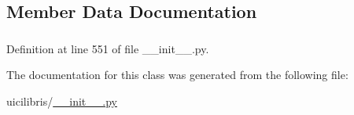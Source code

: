 \subsection{\-Member \-Data \-Documentation}
\hypertarget{classuicilibris_1_1latexViewThread_a2280202512f395afb09e42f820d27fad}{
\subsubsection[{pdf\-File\-Name}]{}}\label{classuicilibris_1_1latexViewThread_a2280202512f395afb09e42f820d27fad}


\-Definition at line 551 of file \-\_\-\-\_\-init\-\_\-\-\_\-.\-py.



\-The documentation for this class was generated from the following file\-:\begin{DoxyCompactItemize}
\item 
uicilibris/\hyperlink{____init_____8py}{\-\_\-\-\_\-init\-\_\-\-\_\-.\-py}\end{DoxyCompactItemize}
